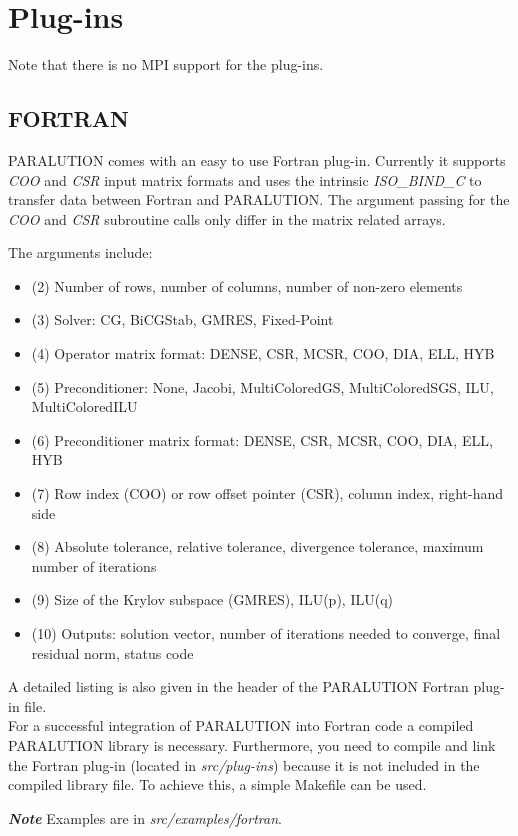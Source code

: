 \chapter {Plug-ins}

Note that there is no MPI support for the plug-ins.

\section{FORTRAN}

PARALUTION comes with an easy to use Fortran plug-in.
Currently it supports \emph{COO} and \emph{CSR} input matrix formats and uses the intrinsic \emph{ISO\_BIND\_C} to transfer data between Fortran and PARALUTION.
The argument passing for the \emph{COO} and \emph{CSR} subroutine calls only differ in the matrix related arrays.





The arguments include:

\begin{itemize}
\itemsep0em
\item (2) Number of rows, number of columns, number of non-zero elements
\item (3) Solver: CG, BiCGStab, GMRES, Fixed-Point
\item (4) Operator matrix format: DENSE, CSR, MCSR, COO, DIA, ELL, HYB
\item (5) Preconditioner: None, Jacobi, MultiColoredGS, MultiColoredSGS, ILU, MultiColoredILU
\item (6) Preconditioner matrix format: DENSE, CSR, MCSR, COO, DIA, ELL, HYB
\item (7) Row index (COO) or row offset pointer (CSR), column index, right-hand side
\item (8) Absolute tolerance, relative tolerance, divergence tolerance, maximum number of iterations
\item (9) Size of the Krylov subspace (GMRES), ILU(p), ILU(q)
\item (10) Outputs: solution vector, number of iterations needed to converge, final residual norm, status code
\end{itemize}

A detailed listing is also given in the header of the PARALUTION Fortran plug-in file.
\\
For a successful integration of PARALUTION into Fortran code a compiled PARALUTION library is necessary.
Furthermore, you need to compile and link the Fortran plug-in (located in \emph{src/plug-ins}) because it is not included in the compiled library file.
To achieve this, a simple Makefile can be used.



\textbf{\emph{Note}} Examples are in \emph{src/examples/fortran}.

